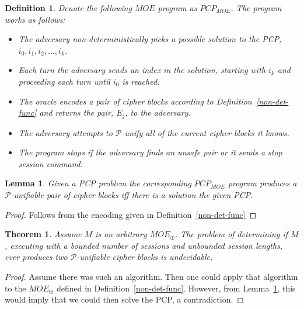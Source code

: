 \documentclass{easychair}
\newtheorem{definition}{Definition}
\newtheorem{theorem}{Theorem}
\newtheorem{lemma}{Lemma}
\begin{document}
\begin{definition}
Denote the following $MOE$ program as $PCP_{MOE}$.
The program works as follows:
\begin{itemize}
	\item The adversary non-deterministically picks a possible
	solution to the PCP, $i_0, i_1, i_2, \ldots, i_k$.
	\item Each turn the adversary sends an index in the solution, 
	starting with $i_k$ and proceeding each turn until $i_0$ 
	is reached. 
	\item The oracle encodes a pair of cipher blocks according 
	to Definition~\ref{non-det-func} and returns the pair,
	$E_j$, to the adversary.
	\item The adversary attempts to $\mathcal{P}$-unify 
	all of the current cipher blocks it knows. 
	\item The program stops if the adversary finds an unsafe
	pair or it sends a stop session command.
\end{itemize}
\end{definition}

\begin{lemma}\label{lemma:pcp_to_moe}
Given a PCP problem the corresponding $PCP_{MOE}$ program 
produces a $\mathcal{P}$-unifiable pair of cipher blocks
iff there is a solution the given PCP. 
\end{lemma}
\begin{proof}
Follows from the encoding given in Definition~\ref{non-det-func}
\end{proof}



\begin{theorem}
	Assume $M$ is an arbitrary $MOE_{\oplus}$. The problem
	of determining if $M$, executing with 
	a bounded number of sessions and unbounded session
	lengths, ever produces two  $\mathcal{P}$-unifiable cipher blocks is undecidable. 
\end{theorem}
\begin{proof}
	Assume there was such an algorithm. Then one could apply that
	algorithm to the $MOE_{\oplus}$ defined in
	Definition~\ref{non-det-func}. However, 
	from Lemma~\ref{lemma:pcp_to_moe}, this would
	imply that we could then solve the PCP, a contradiction.   
\end{proof}
\end{document}
